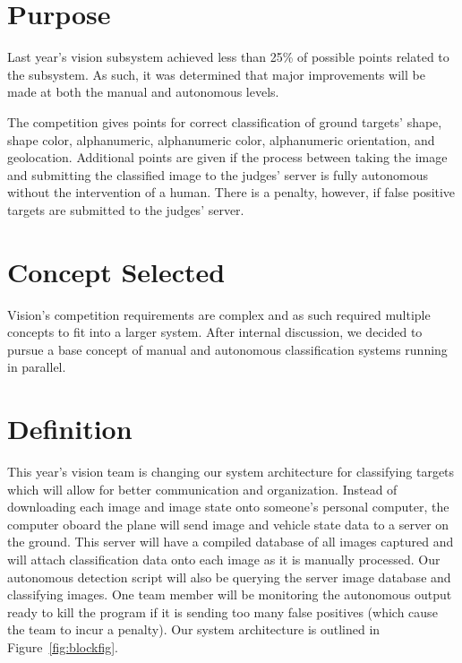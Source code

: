 \documentclass[]{auvsi_doc}
\begin{document}
\begin{AUVSITitlePage}
\begin{artifacttable}
\end{artifacttable}
\end{AUVSITitlePage}

\section{Purpose}

Last year's vision subsystem achieved less than 25\% of possible points related to the subsystem. As such, 
it was determined that major improvements will be made at both the manual and autonomous 
levels.

The competition gives points for correct classification of ground targets' shape, shape color,
alphanumeric, alphanumeric color, alphanumeric orientation, and geolocation. Additional points
are given if the process between taking the image and submitting the classified image to the
judges' server is fully autonomous without the intervention of a human. There is a penalty, 
however, if false positive targets are submitted to the judges' server.

\section{Concept Selected}

Vision's competition requirements are complex and as such required multiple concepts to 
fit into a larger system. After internal discussion, we decided to pursue a base concept 
of manual and autonomous classification systems running in parallel.

\section{Definition}

This year's vision team is changing our system architecture for classifying targets which will
 allow for better communication and organization. Instead of downloading each image and image state
onto someone's personal computer, the computer oboard the plane will send image and vehicle state
data to a server on the ground. This server will have a compiled database of all images captured
and will attach classification data onto each image as it is manually processed. Our 
autonomous detection script will also be querying the server image database and classifying
images. One team member will be monitoring the autonomous output ready to kill the 
program if it is sending too many false positives (which cause the team to incur a 
penalty). Our system architecture is outlined in Figure~\ref{fig:blockfig}.
\end{document}
